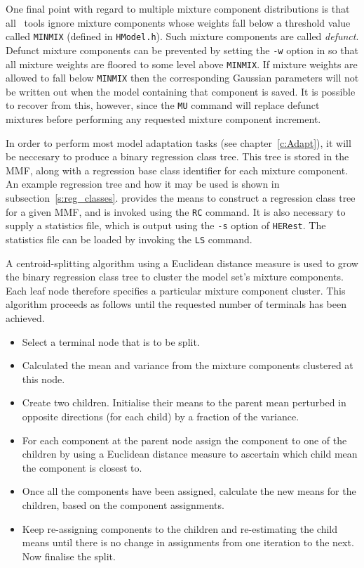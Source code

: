 One final point with regard to multiple mixture component distributions is that
all \HTK\ tools ignore mixture components whose weights fall below a threshold value
called \texttt{MINMIX} (defined in \texttt{HModel.h}).  Such mixture components
are called {\it defunct}.  Defunct mixture components can be
prevented by setting the \texttt{-w} option in  so that all mixture
weights are floored to some level above 
\texttt{MINMIX}.  If 
mixture weights
are allowed to fall below \texttt{MINMIX} then the corresponding Gaussian
parameters will not be written out when the model containing that component
is saved.  It is possible to recover from this, however, since the \texttt{MU} command
will replace defunct mixtures before performing any requested mixture
component increment.


In order to perform most model adaptation tasks (see
chapter~\ref{c:Adapt}), it will be neccesary to produce a binary regression
class tree. 
This tree is stored in the MMF, along with a regression
base class identifier for each mixture component. An example
regression tree and how it may be used is shown in
subsection~\ref{s:reg_classes}.  provides the means to
construct a regression class tree for a given MMF, and is invoked
using the \texttt{RC} command. 
It is also necessary to supply a
statistics file, which is output using the \texttt{-s} option of
\texttt{HERest}. The statistics file can be loaded by invoking the
\texttt{LS} command.

A centroid-splitting algorithm using a Euclidean distance measure is
used to grow the binary regression class tree to cluster the model
set's  mixture components.  Each leaf node therefore specifies a 
particular mixture component cluster. This algorithm proceeds
as follows until the requested number of terminals has been achieved.
\begin{itemize}
\item Select a terminal node that is to be split.
\item Calculated the mean and variance from the mixture components clustered
at this node.
\item Create two children. Initialise their means to the parent mean 
perturbed in opposite directions (for each child) by a fraction of 
the variance.
\item For each component at the parent node assign the component 
to one of the children by using a Euclidean distance measure to 
ascertain which child mean the component is closest to.
\item Once all the components have been assigned, calculate the new
means for the children, based on the component assignments.
\item Keep re-assigning components to the children and re-estimating
the child means until there is no change in assignments from one
iteration to the next. Now finalise the split.
\end{itemize}

